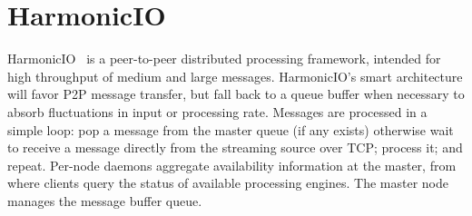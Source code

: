 \documentclass[conference]{IEEEtran}
\begin{document}



\section{HarmonicIO}

HarmonicIO~\cite{torruangwatthanaHarmonicIOScalableData2018} is a peer-to-peer distributed processing framework, intended for high throughput of medium and large messages. 
HarmonicIO's smart architecture will favor P2P message transfer, but fall back to a queue buffer when necessary to absorb fluctuations in input or processing rate. Messages are processed in a simple loop: pop a message from the master queue (if any exists) otherwise wait to receive a message directly from the streaming source over TCP; process it; and repeat. Per-node daemons aggregate availability information at the master, from where clients query the status of available processing engines. The master node manages the message buffer queue.
\end{document}
